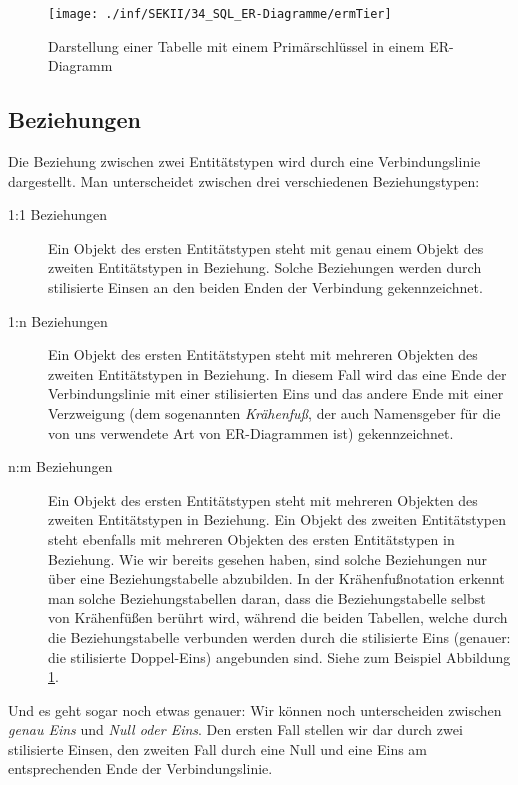 \begin{figure}[h]
  \centering
   \texttt{[image: ./inf/SEKII/34\_SQL\_ER-Diagramme/ermTier]}
   \caption{Darstellung einer Tabelle mit einem Primärschlüssel in einem
   ER-Diagramm}
   \label{fig:erstes-er-diagramm}
\end{figure}

\subsection{Beziehungen}

Die Beziehung zwischen zwei Entitätstypen wird durch eine Verbindungslinie
dargestellt. Man unterscheidet zwischen drei verschiedenen Beziehungstypen:

\begin{description}
\item[1:1 Beziehungen]
Ein Objekt des ersten Entitätstypen steht mit genau einem Objekt des zweiten
Entitätstypen in Beziehung. Solche Beziehungen werden durch stilisierte Einsen
an den beiden Enden der Verbindung gekennzeichnet.

\item[1:n Beziehungen]
Ein Objekt des ersten Entitätstypen steht mit mehreren Objekten des zweiten
Entitätstypen in Beziehung. In diesem Fall wird das eine Ende der
Verbindungslinie mit einer stilisierten Eins und das andere Ende mit einer
Verzweigung (dem sogenannten \textit{Krähenfuß}, der auch Namensgeber für
die von uns verwendete Art von ER-Diagrammen ist) gekennzeichnet.

\item[n:m Beziehungen]
Ein Objekt des ersten Entitätstypen steht mit mehreren Objekten des zweiten
Entitätstypen in Beziehung. Ein Objekt des zweiten Entitätstypen steht ebenfalls
mit mehreren Objekten des ersten Entitätstypen in Beziehung. Wie wir bereits
gesehen haben, sind solche Beziehungen nur über eine Beziehungstabelle
abzubilden. In der Krähenfußnotation erkennt man solche Beziehungstabellen
daran, dass die Beziehungstabelle selbst von Krähenfüßen berührt wird, während
die beiden Tabellen, welche durch die Beziehungstabelle verbunden werden durch
die stilisierte Eins (genauer: die stilisierte Doppel-Eins) angebunden sind.
Siehe zum Beispiel Abbildung \ref{fig:erstes-er-diagramm}.
\end{description}

Und es geht sogar noch etwas genauer: Wir können noch unterscheiden zwischen
\textit{genau Eins} und \textit{Null oder Eins}. Den ersten Fall stellen wir dar
durch zwei stilisierte Einsen, den zweiten Fall durch eine Null und eine Eins am
entsprechenden Ende der Verbindungslinie.

